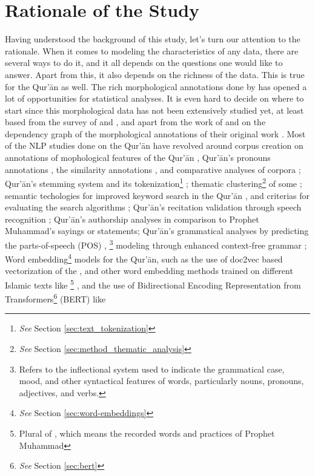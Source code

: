 \section{Rationale of the Study}\label{sec:rationale}
Having understood the background of this study, let's turn our attention to the rationale. When it comes to modeling the characteristics of any data, there are several ways to do it, and it all depends on the questions one would like to answer. Apart from this, it also depends on the richness of the data. This is true for the Qur'\=an as well. The rich morphological annotations done by  has opened a lot of opportunities for statistical analyses. It is even hard to decide on where to start since this morphological data has not been extensively studied yet, at least based from the survey of  and , and apart from the work of   and  on the dependency graph of the morphological annotations of their original work \cite{dukes-habash-2010-morphological}. Most of the NLP studies done on the Qur'\=an have revolved around corpus creation on annotations of mophological features of the Qur'\=an , Qur'\=an's pronouns annotations , the   similarity annotations , and comparative analyses of corpora ; Qur'\=an's stemming system  and its tokenization\footnote{\textit{See} Section \ref{sec:text_tokenization}} ; thematic clustering\footnote{\textit{See} Section \ref{sec:method_thematic_analysis}} of some   ; semantic techologies for improved keyword search in the Qur'\=an , and criterias for evaluating the search algorithms ; Qur'\=an's recitation validation through speech recognition ; Qur'\=an's authorship analyses in comparison to Prophet Muhammad's  sayings or statements; Qur'\=an's grammatical analyses by predicting the parts-of-speech (POS) ,  \footnote{Refers to the inflectional system used to indicate the grammatical case, mood, and other syntactical features of words, particularly nouns, pronouns, adjectives, and verbs.} modeling through enhanced context-free grammar ; Word embedding\footnote{\textit{See} Section \ref{sec:word-embeddings}} models for the Qur'\=an, such as the use of doc2vec based vectorization of the   , and other word embedding methods trained on different Islamic texts like  \footnote{Plural of  , which means the recorded words and practices of Prophet Muhammad } , and the use of Bidirectional Encoding Representation from Transformers\footnote{\textit{See} Section \ref{sec:bert}} (BERT) like 